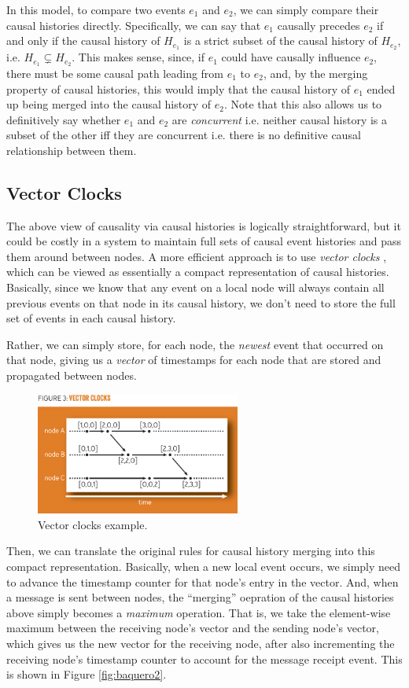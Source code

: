 \documentclass[10pt,a4paper]{article}
\begin{document}
In this model, to compare two events $e_1$ and $e_2$, we can simply compare their causal histories directly. Specifically, we can say that $e_1$ causally precedes $e_2$ if and only if the causal history of $H_{e_1}$ is a strict subset of the causal history of $H_{e_2}$, i.e. $H_{e_1} \subsetneq H_{e_2}$. This makes sense, since, if $e_1$ could have causally influence $e_2$, there must be some causal path leading from $e_1$ to $e_2$, and, by the merging property of causal histories, this would imply that the causal history of $e_1$ ended up being merged into the causal history of $e_2$. Note that this also allows us to definitively say whether $e_1$ and $e_2$ are \textit{concurrent} i.e. neither causal history is a subset of the other iff they are concurrent i.e. there is no definitive causal relationship between them.

\subsection{Vector Clocks}

The above view of causality via causal histories is logically straightforward, but it could be costly in a system to maintain full sets of causal event histories and pass them around between nodes. A more efficient approach is to use \textit{vector clocks} \cite{fidge1988timestamps}, which can be viewed as essentially a compact representation of causal histories. Basically, since we know that any event on a local node will always contain all previous events on that node in its causal history, we don't need to store the full set of events in each causal history. 

Rather, we can simply store, for each node, the \textit{newest} event that occurred on that node, giving us a \textit{vector} of timestamps for each node that are stored and propagated between nodes.
\begin{figure}[h]
    \label{fig:baquero3}
    \centering
    \includegraphics[width=0.6\textwidth]{diagrams/baquero3-vector.png}
    \caption{Vector clocks example.}
\end{figure}
Then, we can translate the original rules for causal history merging into this compact representation. Basically, when a new local event occurs, we simply need to advance the timestamp counter for that node's entry in the vector. And, when a message is sent between nodes, the ``merging'' oepration of the causal histories above simply becomes a \textit{maximum} operation. That is, we take the element-wise maximum between the receiving node's vector and the sending node's vector, which gives us the new vector for the receiving node, after also incrementing the receiving node's timestamp counter to account for the message receipt event. This is shown in Figure \ref{fig:baquero2}. 
\end{document}
